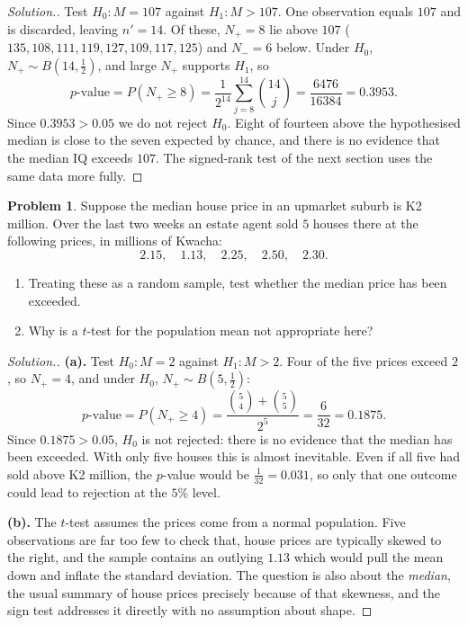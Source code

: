 \documentclass[11pt,a4paper]{article}
\theoremstyle{definition}
\newtheorem{problemx}{Problem}[section]
\newenvironment{problem}{\begin{problemx}}{\end{problemx}}
\newenvironment{solution}
  {\renewcommand{\qedsymbol}{}\begin{proof}[\textit{Solution}.]}
  {\end{proof}}
\begin{document}
\begin{solution}
Test $H_0: M = 107$ against $H_1: M > 107$. One observation equals $107$ and is
discarded, leaving $n' = 14$. Of these, $N_{+} = 8$ lie above $107$
($135, 108, 111, 119, 127, 109, 117, 125$) and $N_{-} = 6$ below. Under $H_0$,
$N_{+}\sim B\left(14, \frac12\right)$, and large $N_{+}$ supports $H_1$, so
\[p\text{-value} = P(N_{+}\geq 8) = \frac{1}{2^{14}}\sum_{j=8}^{14}\binom{14}{j}
 = \frac{6476}{16384} = 0.3953.\]
Since $0.3953 > 0.05$ we do not reject $H_0$. Eight of fourteen above the hypothesised
median is close to the seven expected by chance, and there is no evidence that the
median IQ exceeds $107$. The signed-rank test of the next section uses the same data
more fully.
\end{solution}

\begin{problem}
Suppose the median house price in an upmarket suburb is K2 million. Over the last two
weeks an estate agent sold $5$ houses there at the following prices, in millions of
Kwacha:
\[2.15,\quad 1.13,\quad 2.25,\quad 2.50,\quad 2.30.\]
\begin{enumerate}
\item[(a).] Treating these as a random sample, test whether the median price has been
exceeded.
\item[(b).] Why is a $t$-test for the population mean not appropriate here?
\end{enumerate}
\end{problem}

\begin{solution}
\textbf{(a).} Test $H_0: M = 2$ against $H_1: M > 2$. Four of the five prices exceed
$2$, so $N_{+} = 4$, and under $H_0$, $N_{+}\sim B\left(5,\frac12\right)$:
\[p\text{-value} = P(N_{+}\geq 4) = \frac{\binom54+\binom55}{2^{5}} = \frac{6}{32} = 0.1875.\]
Since $0.1875 > 0.05$, $H_0$ is not rejected: there is no evidence that the median has
been exceeded. With only five houses this is almost inevitable. Even if all five had
sold above K2 million, the $p$-value would be $\frac{1}{32} = 0.031$, so only that one
outcome could lead to rejection at the $5\%$ level.

\textbf{(b).} The $t$-test assumes the prices come from a normal population. Five
observations are far too few to check that, house prices are typically skewed to the
right, and the sample contains an outlying $1.13$ which would pull the mean down and
inflate the standard deviation. The question is also about the \emph{median}, the usual
summary of house prices precisely because of that skewness, and the sign test addresses
it directly with no assumption about shape.
\end{solution}
\end{document}

